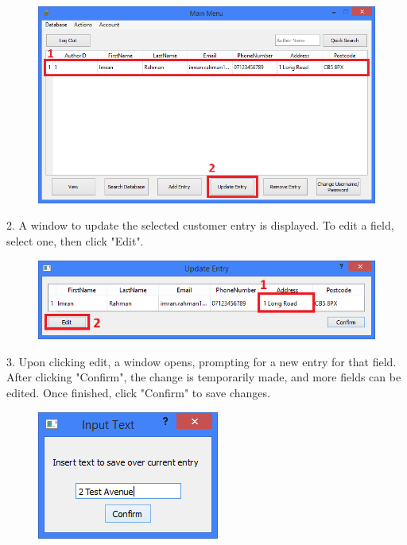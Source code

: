 \begin{figure}[H]
    \includegraphics[width=\textwidth]{./Manual/Tutorial/Q2/SelectingEntry.png}
\end{figure}

2. A window to update the selected customer entry is displayed. To edit a field, select one, then click "Edit".

\begin{figure}[H]
    \includegraphics[width=\textwidth]{./Manual/Tutorial/Q2/EditField.png}
\end{figure}

3. Upon clicking edit, a window opens, prompting for a new entry for that field. After clicking "Confirm", the change is temporarily made, and more fields can be edited. Once finished, click "Confirm" to save changes. 

\begin{figure}[H]
    \includegraphics[width=\textwidth]{./Manual/Tutorial/Q2/InputText.png}
\end{figure}

